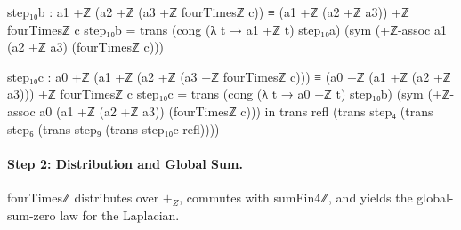\documentclass[11pt,a4paper]{book}
\def\mathbb#1{#1}%
\def\texttt#1{#1}%
\begin{document}
\begin{code}
    step₁₀b : a1 +ℤ (a2 +ℤ (a3 +ℤ fourTimesℤ c)) ≡ (a1 +ℤ (a2 +ℤ a3)) +ℤ fourTimesℤ c
    step₁₀b =
      trans
        (cong (λ t → a1 +ℤ t) step₁₀a)
        (sym (+ℤ-assoc a1 (a2 +ℤ a3) (fourTimesℤ c)))

    step₁₀c : a0 +ℤ (a1 +ℤ (a2 +ℤ (a3 +ℤ fourTimesℤ c))) ≡ (a0 +ℤ (a1 +ℤ (a2 +ℤ a3))) +ℤ fourTimesℤ c
    step₁₀c =
      trans
        (cong (λ t → a0 +ℤ t) step₁₀b)
        (sym (+ℤ-assoc a0 (a1 +ℤ (a2 +ℤ a3)) (fourTimesℤ c)))
  in
  trans
    refl
    (trans
      step₄
      (trans
        step₆
        (trans
          step₉
          (trans
            step₁₀c
            refl))))
\end{code}

\paragraph{Step 2: Distribution and Global Sum.}
\texttt{fourTimesℤ} distributes over $+_{\mathbb{Z}}$, commutes with
\texttt{sumFin4ℤ}, and yields the global-sum-zero law for the Laplacian.
\end{document}
